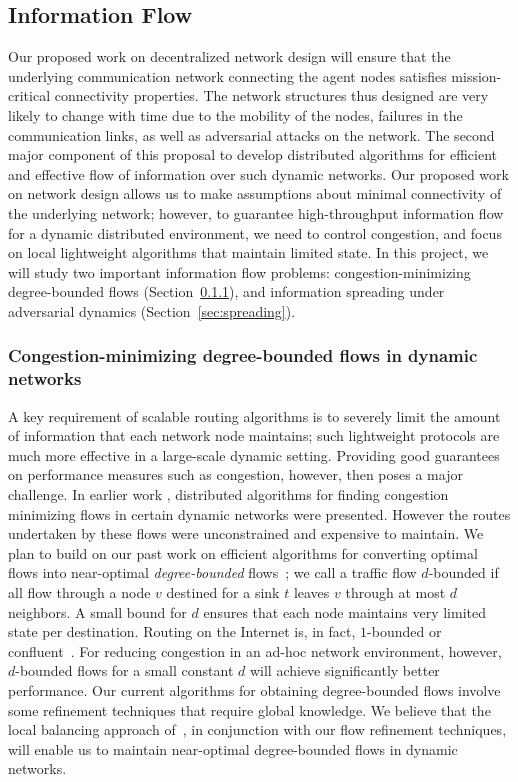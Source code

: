 \subsection{Information Flow}
Our proposed work on decentralized network design will ensure that the
underlying communication network connecting the agent nodes satisfies
mission-critical connectivity properties.  The network structures thus
designed are very likely to change with time due to the mobility of
the nodes, failures in the communication links, as well as adversarial
attacks on the network.  The second major component of this proposal
to develop distributed algorithms for efficient and effective flow of
information over such dynamic networks.  Our proposed work on network
design allows us to make assumptions about minimal connectivity of the
underlying network; however, to guarantee high-throughput information
flow for a dynamic distributed environment, we need to control
congestion, and focus on local lightweight algorithms that maintain
limited state.  In this project, we will study two important
information flow problems: congestion-minimizing degree-bounded flows
(Section~\ref{sec:confluent}), and information spreading under
adversarial dynamics (Section~\ref{sec:spreading}).

\subsubsection{Congestion-minimizing degree-bounded flows in dynamic
  networks}
\label{sec:confluent}
A key requirement of scalable routing algorithms is to severely limit
the amount of information that each network node maintains; such
lightweight protocols are much more effective in a large-scale dynamic
setting.  Providing good guarantees on performance measures such as
congestion, however, then poses a major challenge.  In earlier work
\cite{awerbuch+l:flow}, distributed algorithms for finding congestion
minimizing flows in certain dynamic networks were presented.  However
the routes undertaken by these flows were unconstrained and expensive
to maintain.  We plan to build on our past work on efficient
algorithms for converting optimal flows into near-optimal {\em
  degree-bounded} flows~\cite{chen+klrsv:flow,chen+mrs:flow}; we call
a traffic flow $d$-bounded if all flow through a node $v$ destined for
a sink $t$ leaves $v$ through at most $d$ neighbors.  A small bound
for $d$ ensures that each node maintains very limited state per
destination.  Routing on the Internet is, in fact, $1$-bounded or
confluent~\cite{chen+mrs:flow}.  For reducing congestion in an ad-hoc
network environment, however, $d$-bounded flows for a small constant
$d$ will achieve significantly better performance.  Our current
algorithms for obtaining degree-bounded flows involve some refinement
techniques that require global knowledge.  We believe that the local
balancing approach of~\cite{awerbuch+l:flow}, in conjunction with our
flow refinement techniques, will enable us to maintain near-optimal
degree-bounded flows in dynamic networks.

